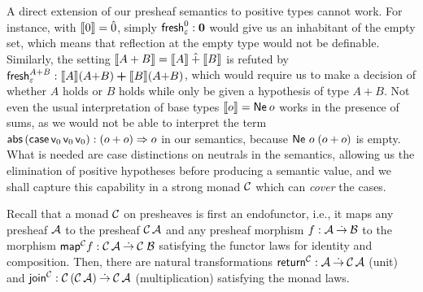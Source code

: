 \documentclass[sigconf,screen,fleqn]{acmart} %
\begin{document}
A direct extension of our presheaf semantics to positive types cannot
work.  For instance, with $\den \tyzero = \hat0$, simply
$\tfresh^{\tyzero}_{\cempty} : \bzero$
would give us an
inhabitant of the empty set, which means that reflection at the empty
type would not be definable.  Similarly, the setting
$\den{A + B} = \den A \hatplus \den B$ is refuted by
$\tfresh^{A + B}_{\cempty} : \den A (A{+}B) \bplus \den B (A{+}B)$,
which would require us to make a decision of whether $A$ holds or $B$ holds
while only be given a hypothesis of type $A + B$.
Not even the usual interpretation of base types $\den o = \tNe\,o$
works in the presence of sums, as we would not be able to interpret
the term
$\tabs\,(\tcase\,\vv0\,\vv0\,\vv0) :
(o+o) \To o$ in our semantics, because $\Ne o (o+o)$ is empty.
What is needed are case distinctions on neutrals in the semantics,
allowing us the elimination of positive hypotheses before producing a
semantic value,
and we shall capture this capability in a strong monad $\C$
which can \emph{cover} the cases.

Recall that a monad $\C$ on presheaves is first an endofunctor,
i.e., it maps any presheaf $\A$ to the presheaf $\C\,\A$ and any
presheaf morphism $f : \A \todot \B$ to the morphism
$\tmap[\C]f: \C\,\A \todot \C\;\B$ satisfying the functor laws for
identity and composition.  Then, there are natural transformations
$\treturn[\C] : \A \todot \C\,\A$ (unit) and
$\tjoin[\C] : \C\,(\C\,\A) \todot \C\,\A$ (multiplication)
satisfying
the monad laws.
\end{document}
